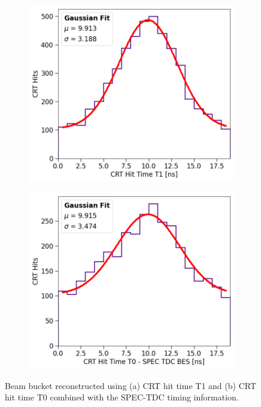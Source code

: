 \begin{figure}[hb!]
\begin{subfigure}[h]{0.495\linewidth}
\centering    
\includegraphics[width=\linewidth]{CRT_T1_Bucket}
\caption{}
\label{fig:beamBucket_T1}
\end{subfigure}%
\hfill
\begin{subfigure}[h]{0.495\linewidth}
\centering    
\includegraphics[width=\linewidth]{CRTT0_SPEC_Bucket}
\caption{}
\label{fig:beamBucket_T0}
\end{subfigure}
\caption[Reconstructed Beam Bucket Using CRT Sharps]{
Beam bucket reconstructed using (a) CRT hit time T1 and (b) CRT hit time T0 combined with the SPEC-TDC timing information. 
}
\label{fig:beamBucket}
\end{figure}

